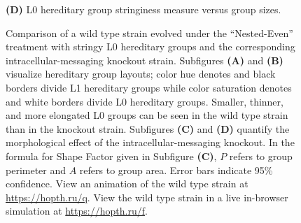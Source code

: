 \begin{figure}[!htbp]
\begin{center}
\begin{minipage}[t]{0.5\linewidth}
\hspace*{\fill}%
\begin{minipage}[t]{\columnwidth}
\centering
\vspace{0pt} %
\begin{minipage}[b]{\textwidth}
{\textbf{(D)} L0 hereditary group stringiness measure versus group sizes.}
\end{minipage}
\end{minipage}%
\hspace*{\fill}

\end{minipage}

\caption{
Comparison of a wild type strain evolved under the ``Nested-Even'' treatment with stringy L0 hereditary groups and the corresponding intracellular-messaging knockout strain.
Subfigures \textbf{(A)} and \textbf{(B)} visualize hereditary group layouts;
color hue denotes and black borders divide L1 hereditary groups while color saturation denotes and white borders divide L0 hereditary groups.
Smaller, thinner, and more elongated L0 groups can be seen in the wild type strain than in the knockout strain.
Subfigures \textbf{(C)} and \textbf{(D)} quantify the morphological effect of the intracellular-messaging knockout.
In the formula for Shape Factor given in Subfigure \textbf{(C)}, $P$ refers to group perimeter and $A$ refers to group area.
Error bars indicate 95\% confidence.
View an animation of the wild type strain at \url{https://hopth.ru/q}.
View the wild type strain in a live in-browser simulation at \url{https://hopth.ru/f}.
}
\label{fig:ko-morphology}
\end{center}
\end{figure}
